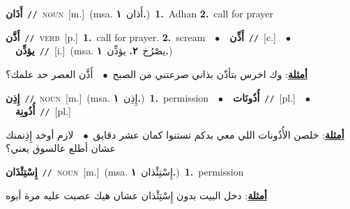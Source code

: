 \documentclass[10pt,a4paper,twoside]{article} %
\begin{document}
\begin{multicols}{2}
{\setlength\topsep{0pt}\textbf{\foreignlanguage{arabic}{أَذَان}}\ {\color{gray}\texttt{//}\color{black}}\ \textsc{noun}\ [m.]\ \color{gray}(msa. \foreignlanguage{arabic}{أَذان}~\foreignlanguage{arabic}{\textbf{١.}})\color{black}\ \textbf{1.}~Adhan  \textbf{2.}~call for prayer\ } \vspace{2mm}

{\setlength\topsep{0pt}\textbf{\foreignlanguage{arabic}{أَذَّن}}\ {\color{gray}\texttt{//}\color{black}}\ \textsc{verb}\ [p.]\ \textbf{1.}~call for prayer.  \textbf{2.}~scream\ \ $\bullet$\ \ \setlength\topsep{0pt}\textbf{\foreignlanguage{arabic}{أَذِّن}}\ {\color{gray}\texttt{//}\color{black}}\ [c.]\ \ $\bullet$\ \ \setlength\topsep{0pt}\textbf{\foreignlanguage{arabic}{يؤذِّن}}\ {\color{gray}\texttt{//}\color{black}}\ [i.]\ \color{gray}(msa. \foreignlanguage{arabic}{يصْرُخ}~\foreignlanguage{arabic}{\textbf{٢.}}  \foreignlanguage{arabic}{يؤذِّن}~\foreignlanguage{arabic}{\textbf{١.}})\color{black}\  \begin{flushright}\color{gray}\foreignlanguage{arabic}{\textbf{\underline{\foreignlanguage{arabic}{أمثلة}}}: وك اخرس بتأذّن بذاني صرعتني من الصبح\ $\bullet$\ \  أَذَّن العصر حد علمك؟}\end{flushright}\color{black}} \vspace{2mm}

{\setlength\topsep{0pt}\textbf{\foreignlanguage{arabic}{إِذِن}}\ {\color{gray}\texttt{//}\color{black}}\ \textsc{noun}\ [m.]\ \color{gray}(msa. \foreignlanguage{arabic}{إِذِن}~\foreignlanguage{arabic}{\textbf{١.}})\color{black}\ \textbf{1.}~permission\ \ $\bullet$\ \ \setlength\topsep{0pt}\textbf{\foreignlanguage{arabic}{أُذُونَات}}\ {\color{gray}\texttt{//}\color{black}}\ [pl.]\ \ $\bullet$\ \ \setlength\topsep{0pt}\textbf{\foreignlanguage{arabic}{أُذُونِة}}\ {\color{gray}\texttt{//}\color{black}}\ [pl.]\  \begin{flushright}\color{gray}\foreignlanguage{arabic}{\textbf{\underline{\foreignlanguage{arabic}{أمثلة}}}: خلصن الأُذُونات اللي معي بدكم تستنوا كمان عشر دقايق\ $\bullet$\ \  لازم أوخد إِذِنمنك عشان أطلع عالسوق يعني؟}\end{flushright}\color{black}} \vspace{2mm}

{\setlength\topsep{0pt}\textbf{\foreignlanguage{arabic}{إِسْتِئْذَان}}\ {\color{gray}\texttt{//}\color{black}}\ \textsc{noun}\ [m.]\ \color{gray}(msa. \foreignlanguage{arabic}{إِسْتِئْذان}~\foreignlanguage{arabic}{\textbf{١.}})\color{black}\ \textbf{1.}~permission\  \begin{flushright}\color{gray}\foreignlanguage{arabic}{\textbf{\underline{\foreignlanguage{arabic}{أمثلة}}}: دخل البيت بدون إِسْتِئْذان عشان هيك عصبت عليه مرة أبوه}\end{flushright}\color{black}} \vspace{2mm}


\end{multicols}
\end{document}
